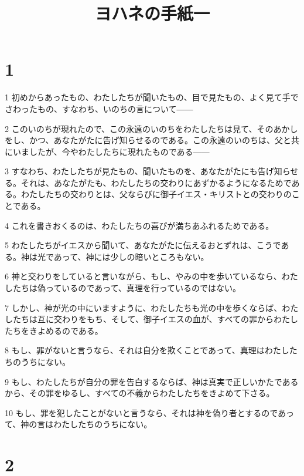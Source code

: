 

\title{ヨハネの手紙一}


\chapter{1}

\par 1 初めからあったもの、わたしたちが聞いたもの、目で見たもの、よく見て手でさわったもの、すなわち、いのちの言について――
\par 2 このいのちが現れたので、この永遠のいのちをわたしたちは見て、そのあかしをし、かつ、あなたがたに告げ知らせるのである。この永遠のいのちは、父と共にいましたが、今やわたしたちに現れたものである――
\par 3 すなわち、わたしたちが見たもの、聞いたものを、あなたがたにも告げ知らせる。それは、あなたがたも、わたしたちの交わりにあずかるようになるためである。わたしたちの交わりとは、父ならびに御子イエス・キリストとの交わりのことである。
\par 4 これを書きおくるのは、わたしたちの喜びが満ちあふれるためである。
\par 5 わたしたちがイエスから聞いて、あなたがたに伝えるおとずれは、こうである。神は光であって、神には少しの暗いところもない。
\par 6 神と交わりをしていると言いながら、もし、やみの中を歩いているなら、わたしたちは偽っているのであって、真理を行っているのではない。
\par 7 しかし、神が光の中にいますように、わたしたちも光の中を歩くならば、わたしたちは互に交わりをもち、そして、御子イエスの血が、すべての罪からわたしたちをきよめるのである。
\par 8 もし、罪がないと言うなら、それは自分を欺くことであって、真理はわたしたちのうちにない。
\par 9 もし、わたしたちが自分の罪を告白するならば、神は真実で正しいかたであるから、その罪をゆるし、すべての不義からわたしたちをきよめて下さる。
\par 10 もし、罪を犯したことがないと言うなら、それは神を偽り者とするのであって、神の言はわたしたちのうちにない。

\chapter{2}

